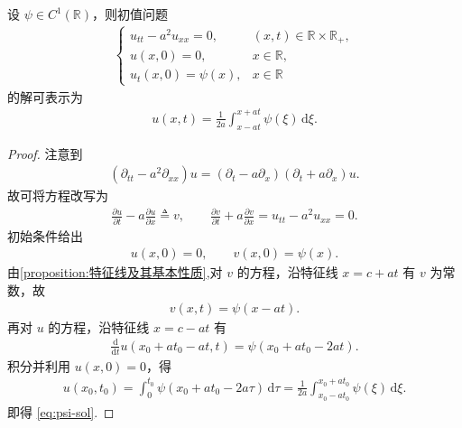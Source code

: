 \documentclass[../../main.tex]{subfiles}%
\begin{document}
\begin{proposition}\label{proposition:初值问题的解的表示}
设 $\psi\in C^1(\mathbb{R})$，则初值问题
\begin{align}
\begin{cases}
u_{tt}-a^2u_{xx}=0, & (x,t)\in\mathbb{R}\times\mathbb{R}_+, \\
u(x,0)=0, & x\in\mathbb{R}, \\
u_t(x,0)=\psi(x), & x\in\mathbb{R}
\end{cases} \label{eq:psi-exercise}
\end{align}
的解可表示为
\begin{align}
u(x,t)=\frac{1}{2a}\int_{x-at}^{x+at}\psi(\xi)\,\mathrm{d}\xi. \label{eq:psi-sol}
\end{align}
\end{proposition}
\begin{proof}
注意到
\begin{align*}
\left( \partial _{tt}-a^2\partial _{xx} \right) u=\left( \partial _t-a\partial _x \right) \left( \partial _t+a\partial _x \right) u.
\end{align*}
故可将方程改写为
\begin{align*}
\frac{\partial u}{\partial t}-a\frac{\partial u}{\partial x}\triangleq v,\qquad
\frac{\partial v}{\partial t}+a\frac{\partial v}{\partial x}=u_{tt}-a^2u_{xx}=0.
\end{align*}
初始条件给出
\begin{align*}
u(x,0)=0,\qquad v(x,0)=\psi(x).
\end{align*}
由\cref{proposition:特征线及其基本性质},对 $v$ 的方程，沿特征线 $x=c+at$ 有 $v$ 为常数，故
\begin{align*}
v(x,t)=\psi(x-at).
\end{align*}
再对 $u$ 的方程，沿特征线 $x=c-at$ 有
\begin{align*}
\frac{\mathrm{d}}{\mathrm{d}t}u(x_0+at_0-at,t)=\psi(x_0+at_0-2at).
\end{align*}
积分并利用 $u(x,0)=0$，得
\begin{align*}
u(x_0,t_0)=\int_0^{t_0}\psi(x_0+at_0-2a\tau)\,\mathrm{d}\tau
=\frac{1}{2a}\int_{x_0-at_0}^{x_0+at_0}\psi(\xi)\,\mathrm{d}\xi.
\end{align*}
即得 \eqref{eq:psi-sol}.
\end{proof}
\end{document}
